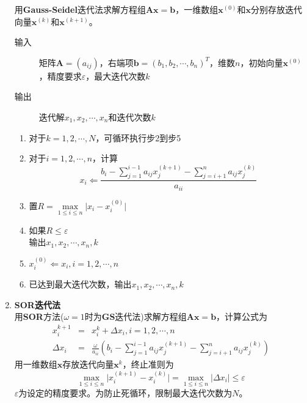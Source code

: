 \documentclass[a4paper,11pt]{article}
\begin{document}
\begin{enumerate}
	用\textbf{Gauss-Seidel}迭代法求解方程组$\boldsymbol{Ax=b}$，一维数组$\boldsymbol{x}^{(0)}$和$\boldsymbol{x}$分别存放迭代向量$\boldsymbol{x}^{(k)}$和$\boldsymbol{x}^{(k+1)}$。
	\begin{description}
		\item[输入 ] 矩阵$\boldsymbol{A}=\left(a_{ij}\right)$，右端项$\boldsymbol{b}=\left(b_1,b_2,\cdots,b_n\right)^T$，维数$n$，初始向量$\boldsymbol{x}^{(0)}$，精度要求$\varepsilon$，最大迭代次数$k$
		\item[输出 ] 迭代解$x_1,x_2,\cdots,x_n$和迭代次数$k$
	\end{description}
	\begin{enumerate}[(1)]
		\item 对于$k=1,2,\cdots,N$，可循环执行步2到步5
		\item 对于$i=1,2,\cdots,n$，计算
			\begin{displaymath}
				x_{i}\Leftarrow{}\frac{b_{i}-\sum\limits_{j=1}^{i-1}a_{ij}x_{j}^{(k+1)}-\sum\limits_{j=i+1}^{n}a_{ij}x_{j}^{(k)}}{a_{ii}}
			\end{displaymath}
		\item 置$R=\max\limits_{1\leqslant{}i\leqslant{}n}\Big|x_{i}-x_{i}^{(0)}\Big|$
		\item 如果$R\leqslant{}\varepsilon$\\输出$x_1,x_2,\cdots,x_n,k$
		\item $x_{i}^{(0)}\Leftarrow{}x_{i},i=1,2,\cdots,n$
		\item 已达到最大迭代次数，输出$x_1,x_2,\cdots,x_n,k$
	\end{enumerate}
	\item \textbf{SOR迭代法\\}
	用\textbf{SOR}方法($\omega=1$时为\textbf{GS}迭代法)求解方程组$\boldsymbol{Ax=b}$，计算公式为
	\begin{eqnarray}
		x_{i}^{k+1}&=&x_{i}^{k}+\Delta{}x_{i},i=1,2,\cdots,n \nonumber \\
		\Delta{}x_{i}&=&\frac{\omega}{a_{ii}}\left(b_{i}-\sum\limits_{j=1}^{i-1}a_{ij}x_{j}^{(k+1)}-\sum\limits_{j=i+1}^{n}a_{ij}x_{j}^{(k)}\right) \nonumber
	\end{eqnarray}
	用一维数组$\boldsymbol{x}$存放迭代向量$\boldsymbol{x}^{k}$，终止准则为
	\begin{displaymath}
		\max\limits_{1\leqslant{}i\leqslant{}n}\Big|x_{i}^{(k+1)}-x_{i}^{(k)}\Big|=\max\limits_{1\leqslant{}i\leqslant{}n}\Big|\Delta{}x_{i}\Big|\leqslant{}\varepsilon
	\end{displaymath}
	$\varepsilon$为设定的精度要求。为防止死循环，限制最大迭代次数为$N$。

\end{enumerate}
\end{document}

